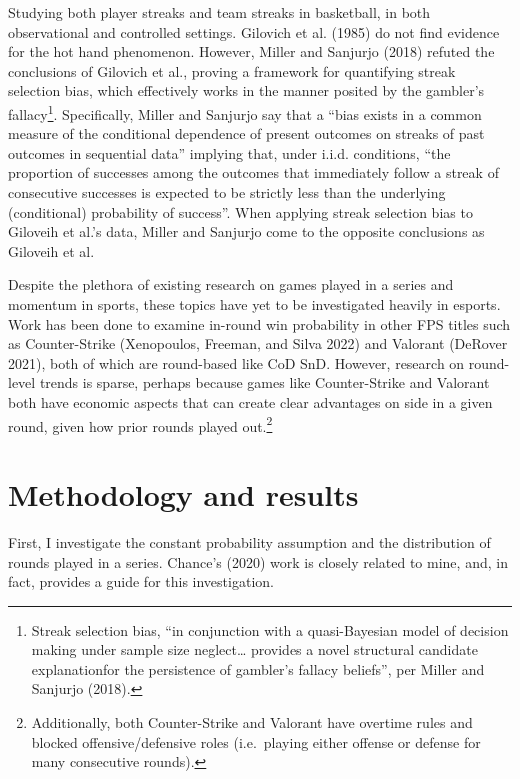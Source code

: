 \documentclass{article}
\begin{document}
Studying both player streaks and team streaks in basketball, in both
observational and controlled settings. Gilovich et al. (1985) do not
find evidence for the hot hand phenomenon. However, Miller and Sanjurjo
(2018) refuted the conclusions of Gilovich et al., proving a framework
for quantifying streak selection bias, which effectively works in the
manner posited by the gambler's fallacy\footnote{Streak selection bias,
  ``in conjunction with a quasi-Bayesian model of decision making under
  sample size neglect\ldots{} provides a novel structural candidate
  explanationfor the persistence of gambler's fallacy beliefs'', per
  Miller and Sanjurjo (2018).}. Specifically, Miller and Sanjurjo say
that a ``bias exists in a common measure of the conditional dependence
of present outcomes on streaks of past outcomes in sequential data''
implying that, under i.i.d. conditions, ``the proportion of successes
among the outcomes that immediately follow a streak of consecutive
successes is expected to be strictly less than the underlying
(conditional) probability of success''. When applying streak selection
bias to Giloveih et al.'s data, Miller and Sanjurjo come to the opposite
conclusions as Giloveih et al.

Despite the plethora of existing research on games played in a series
and momentum in sports, these topics have yet to be investigated heavily
in esports. Work has been done to examine in-round win probability in
other FPS titles such as Counter-Strike (Xenopoulos, Freeman, and Silva
2022) and Valorant (DeRover 2021), both of which are round-based like
CoD SnD. However, research on round-level trends is sparse, perhaps
because games like Counter-Strike and Valorant both have economic
aspects that can create clear advantages on side in a given round, given
how prior rounds played out.\footnote{Additionally, both Counter-Strike
  and Valorant have overtime rules and blocked offensive/defensive roles
  (i.e.~playing either offense or defense for many consecutive rounds).}

\hypertarget{methodology-and-results}{%
\section{Methodology and results}\label{methodology-and-results}}

First, I investigate the constant probability assumption and the
distribution of rounds played in a series. Chance's (2020) work is
closely related to mine, and, in fact, provides a guide for this
investigation.
\end{document}
